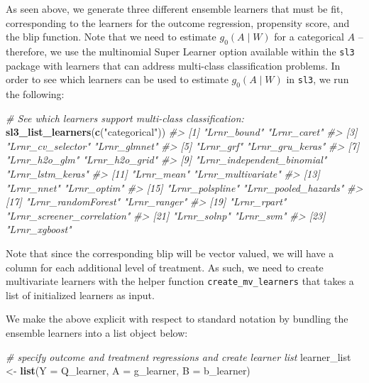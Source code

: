 \documentclass[12pt, krantz2,]{krantz}
\newenvironment{Shaded}{\begin{snugshade}}{\end{snugshade}}
\newcommand{\CommentTok}[1]{\textcolor[rgb]{0.37,0.37,0.37}{\textit{#1}}}
\newcommand{\DataTypeTok}[1]{\textcolor[rgb]{0.27,0.27,0.27}{#1}}
\newcommand{\KeywordTok}[1]{\textcolor[rgb]{0.27,0.27,0.27}{\textbf{#1}}}
\newcommand{\NormalTok}[1]{#1}
\newcommand{\StringTok}[1]{\textcolor[rgb]{0.5,0.5,0.5}{#1}}
\theoremstyle{definition}
\theoremstyle{definition}
\theoremstyle{definition}
\newcommand{\1}{\mathbbm{1}}
\begin{document}
As seen above, we generate three different ensemble learners that must be fit,
corresponding to the learners for the outcome regression, propensity score, and
the blip function. Note that we need to estimate \(g_0(A \mid W)\) for a
categorical \(A\) -- therefore, we use the multinomial Super Learner option
available within the \texttt{sl3} package with learners that can address multi-class
classification problems. In order to see which learners can be used to estimate
\(g_0(A \mid W)\) in \texttt{sl3}, we run the following:

\begin{Shaded}
\begin{Highlighting}[]
\CommentTok{# See which learners support multi-class classification:}
\KeywordTok{sl3_list_learners}\NormalTok{(}\KeywordTok{c}\NormalTok{(}\StringTok{"categorical"}\NormalTok{))}
\CommentTok{#>  [1] "Lrnr_bound"                "Lrnr_caret"               }
\CommentTok{#>  [3] "Lrnr_cv_selector"          "Lrnr_glmnet"              }
\CommentTok{#>  [5] "Lrnr_grf"                  "Lrnr_gru_keras"           }
\CommentTok{#>  [7] "Lrnr_h2o_glm"              "Lrnr_h2o_grid"            }
\CommentTok{#>  [9] "Lrnr_independent_binomial" "Lrnr_lstm_keras"          }
\CommentTok{#> [11] "Lrnr_mean"                 "Lrnr_multivariate"        }
\CommentTok{#> [13] "Lrnr_nnet"                 "Lrnr_optim"               }
\CommentTok{#> [15] "Lrnr_polspline"            "Lrnr_pooled_hazards"      }
\CommentTok{#> [17] "Lrnr_randomForest"         "Lrnr_ranger"              }
\CommentTok{#> [19] "Lrnr_rpart"                "Lrnr_screener_correlation"}
\CommentTok{#> [21] "Lrnr_solnp"                "Lrnr_svm"                 }
\CommentTok{#> [23] "Lrnr_xgboost"}
\end{Highlighting}
\end{Shaded}

Note that since the corresponding blip will be vector valued, we will have a
column for each additional level of treatment. As such, we need to create
multivariate learners with the helper function \texttt{create\_mv\_learners} that takes a
list of initialized learners as input.

We make the above explicit with respect to standard notation by bundling the
ensemble learners into a list object below:

\begin{Shaded}
\begin{Highlighting}[]
\CommentTok{# specify outcome and treatment regressions and create learner list}
\NormalTok{learner_list <-}\StringTok{ }\KeywordTok{list}\NormalTok{(}\DataTypeTok{Y =}\NormalTok{ Q_learner, }\DataTypeTok{A =}\NormalTok{ g_learner, }\DataTypeTok{B =}\NormalTok{ b_learner)}
\end{Highlighting}
\end{Shaded}
\end{document}

